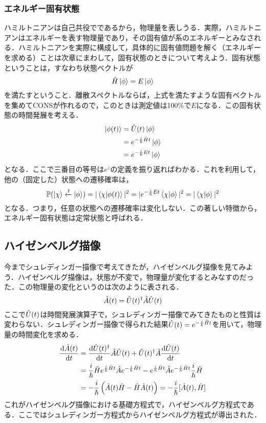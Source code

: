 \documentclass[a4paper,10pt,uplatex]{jsarticle}
\begin{document}
\subsubsection{エネルギー固有状態}
ハミルトニアンは自己共役でであるから，物理量を表しうる．実際，ハミルトニアンはエネルギーを表す物理量であり，その固有値が系のエネルギーとみなされる．ハミルトニアンを実際に構成して，具体的に固有値問題を解く（エネルギーを求める）ことは次章にまわして，固有状態のときについて考えよう．固有状態ということは，すなわち状態ベクトルが
\begin{equation}
    \hat{H} \ket{\phi} = E\ket{\phi}
\end{equation}
を満たすということ．離散スペクトルならば，上式を満たすような固有ベクトルを集めてCONSが作れるので，このときは測定値は100\%で$E$になる．この固有状態の時間発展を考える．
\begin{align}
    \ket{\phi(t)} &= \hat{U}(t) \ket{\phi} \\
    &= e^{-\frac{i}{\hbar}\hat{H} t} \ket{\phi} \\
    &= e^{-\frac{i}{\hbar}Et} \ket{\phi}
\end{align}
となる．ここで三番目の等号は$e^z$の定義を振り返ればわかる．これを利用して，他の（固定した）状態への遷移確率は，
\begin{equation}
    \mathbb{P}(\ket{\chi} \xleftarrow{t} \ket{\phi}) = |\braket{\chi}{\phi(t)}|^2 = |e^{-\frac{i}{\hbar}Et}\braket{\chi}{\phi}|^2 = |\braket{\chi}{\phi}|^2
\end{equation}
となる．つまり，任意の状態への遷移確率は変化しない．この著しい特徴から，エネルギー固有状態は定常状態と呼ばれる．

\begin{comment}
    描像：時間発展演算子がユニタリー，ハミルトニアンは時間不変，シュレディンガー方程式
\end{comment}

\subsection{ハイゼンベルグ描像}
今までシュレディンガー描像で考えてきたが，ハイゼンベルグ描像を見てみよう．ハイゼンベルグ描像は，状態が不変で，物理量が変化するとみなすのだった．この物理量の変化というのは次のように表される．
\begin{equation}
    \hat{A}(t) = \hat{U}(t)^\dagger \hat{A} \hat{U}(t)
\end{equation}
ここで$\hat{U}(t)$は時間発展演算子で，シュレディンガー描像でみてきたものと性質は変わらない．シュレディンガー描像で得られた結果$\hat{U}(t) = e^{-\frac{i}{\hbar}\hat{H} t}$を用いて，物理量の時間変化を求める．
\begin{align}
    \dv{\hat{A}(t)}{t} &= \dv{\hat{U}(t)^\dagger}{t}\hat{A}\hat{U}(t) + \hat{U}(t)^\dagger \hat{A}\dv{\hat{U}(t)}{t} \\
    &= \frac{i}{\hbar} \hat{H} e^{\frac{i}{\hbar}\hat{H} t} \hat{A} e^{-\frac{i}{\hbar}\hat{H} t} - e^{\frac{i}{\hbar}\hat{H} t}\hat{A} e^{-\frac{i}{\hbar}\hat{H} t} \frac{i}{\hbar} \hat{H} \\
    &= -\frac{i}{\hbar}\left(\hat{A}(t)\hat{H} - \hat{H}\hat{A}(t)\right) = -\frac{i}{\hbar}[\hat{A}(t), \hat{H}]
\end{align}
これがハイゼンベルグ描像における基礎方程式で，ハイゼンベルグ方程式である．ここではシュレディンガー方程式からハイゼンベルグ方程式が導出された．
\end{document}
